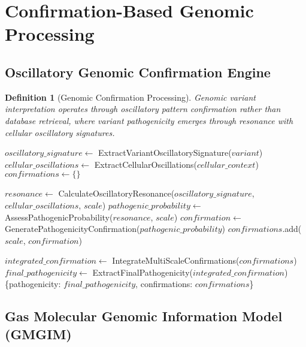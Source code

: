\documentclass[12pt,a4paper]{article}
\newtheorem{definition}{Definition}
\begin{document}
\section{Confirmation-Based Genomic Processing}

\subsection{Oscillatory Genomic Confirmation Engine}

\begin{definition}[Genomic Confirmation Processing]
Genomic variant interpretation operates through oscillatory pattern confirmation rather than database retrieval, where variant pathogenicity emerges through resonance with cellular oscillatory signatures.
\end{definition}

\begin{algorithm}
\caption{Confirmation-Based Genomic Variant Analysis}
\begin{algorithmic}
    \State $oscillatory\_signature \gets$ ExtractVariantOscillatorySignature($variant$)
    \State $cellular\_oscillations \gets$ ExtractCellularOscillations($cellular\_context$)
    \State $confirmations \gets \{\}$
    
        \State $resonance \gets$ CalculateOscillatoryResonance($oscillatory\_signature$, $cellular\_oscillations$, $scale$)
        \State $pathogenic\_probability \gets$ AssessPathogenicProbability($resonance$, $scale$)
        \State $confirmation \gets$ GeneratePathogenicityConfirmation($pathogenic\_probability$)
        \State $confirmations$.add($scale$, $confirmation$)
    \EndFor
    
    \State $integrated\_confirmation \gets$ IntegrateMultiScaleConfirmations($confirmations$)
    \State $final\_pathogenicity \gets$ ExtractFinalPathogenicity($integrated\_confirmation$)
    \State \Return \{pathogenicity: $final\_pathogenicity$, confirmations: $confirmations$\}
\EndProcedure
\end{algorithmic}
\end{algorithm}

\subsection{Gas Molecular Genomic Information Model (GMGIM)}
\end{document}
